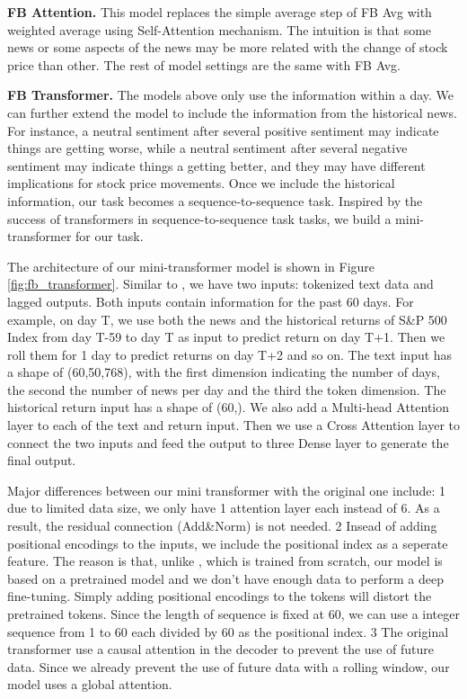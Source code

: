 \documentclass[11pt]{article}
\begin{document}
\textbf{FB Attention.} This model replaces the simple average step of FB Avg with weighted average using Self-Attention mechanism. The intuition is that some news or some aspects of the news may be more related with the change of stock price than other. The rest of model settings are the same with FB Avg.

\textbf{FB Transformer.} The models above only use the information within a day. We can further extend the model to include the information from the historical news. For instance, a neutral sentiment after several positive sentiment may indicate things are getting worse, while a neutral sentiment after several negative sentiment may indicate things a getting better, and they may have different implications for stock price movements. Once we include the historical information, our task becomes a sequence-to-sequence task. Inspired by the success of transformers in sequence-to-sequence task tasks, we build a mini-transformer for our task.

The architecture of our mini-transformer model is shown in Figure \ref{fig:fb_transformer}. Similar to \citet{NIPS2017_3f5ee243}, we have two inputs: tokenized text data and lagged outputs. Both inputs contain information for the past 60 days. For example, on day T, we use both the news and the historical returns of S\&P 500 Index from day T-59 to day T as input to predict return on day T+1. Then we roll them for 1 day to predict returns on day T+2 and so on. The text input has a shape of (60,50,768), with the first dimension indicating the number of days, the second the number of news per day and the third the token dimension. The historical return input has a shape of (60,). We also add a Multi-head Attention layer to each of the text and return input. Then we use a Cross Attention layer to connect the two inputs and feed the output to three Dense layer to generate the final output.

Major differences between our mini transformer with the original one include: 1\) due to limited data size, we only have 1 attention layer each instead of 6. As a result, the residual connection (Add\&Norm) is not needed. 2\) Insead of adding positional encodings to the inputs, we include the positional index as a seperate feature. The reason is that, unlike \citet{NIPS2017_3f5ee243}, which is trained from scratch, our model is based on a pretrained model and we don't have enough data to perform a deep fine-tuning. Simply adding positional encodings to the tokens will distort the pretrained tokens. Since the length of sequence is fixed at 60, we can use a integer sequence from 1 to 60 each divided by 60 as the positional index. 3\) The original transformer use a causal attention in the decoder to prevent the use of future data. Since we already prevent the use of future data with a rolling window, our model uses a global attention.
\end{document}
